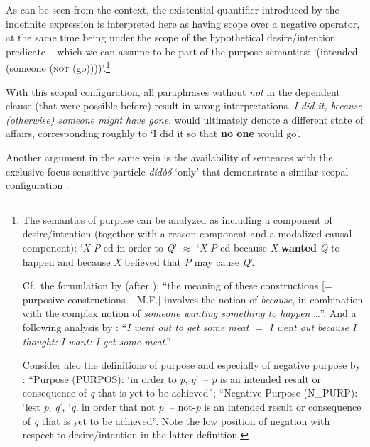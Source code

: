 \documentclass[output=paper,colorlinks,citecolor=brown
]{langscibook}
\begin{document}
\noindent As can be seen from the context, the existential quantifier introduced by the indefinite expression is interpreted here as having scope over a negative operator, at the same time being under the scope of the hypothetical desire\slash intention predicate -- which we can assume to be part of the purpose semantics: `(intended (someone (\textsc{not} (go))))'.\footnote{The semantics of purpose can be analyzed as including a component of desire\slash intention (together with a reason component and a modalized causal component): `\textit{X} \textit{P}-ed in order to \textit{Q}' $\approx$ `\textit{X} \textit{P}-ed because \textit{X} \textbf{wanted} \textit{Q} to happen and because \textit{X} believed that \textit{P} may cause \textit{Q}'.

Cf.\ the formulation by \citet[44]{goddard1991} (after \citealt{wierzbicka1989}): ``the meaning of these constructions [= purposive constructions -- M.F.] involves the notion of \textit{because}, in combination with the complex notion of \textit{someone wanting something to happen}  {\dots}''. And a following analysis by \citet[409]{wierzbicka1992}: ``\textit{I went out to get some meat $=$ I went out because I thought: I want: I get some meat}.''

Consider also the definitions of purpose and especially of negative purpose by \citet[86]{kortmann1996}: ``Purpose (PURPOS): `in order to \textit{p}, \textit{q}'~-- \textit{p} is an intended result or consequence of \textit{q} that is yet to be achieved''; ``Negative Purpose (N\_PURP): `lest \textit{p}, \textit{q}', `\textit{q}, in order that not \textit{p}' -- not-\textit{p} is an intended result or consequence of \textit{q} that is yet to be achieved''. Note the low position of negation with respect to desire\slash intention in the latter definition.}


With this scopal configuration, all paraphrases without \textit{not} in the dependent clause (that were possible before) result in wrong interpretations. \textit{I did it, because (otherwise) someone might have gone}, would ultimately denote a different state of affairs, corresponding roughly to `I did it so that \textbf{no one} would go'.

Another argument in the same vein is the availability of sentences with the exclusive focus-sensitive particle \textit{dídòő} `only' that demonstrate a similar scopal configuration .



\z
\end{document}
